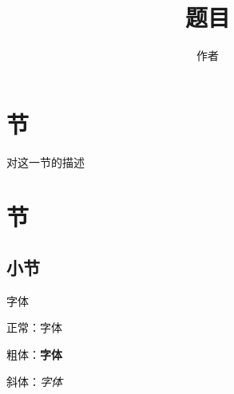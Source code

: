 \documentclass{sty/myarticle}
\title{\heiti 题目}
\author{作者}
\date{}
\begin{document}
\maketitle
\pagestyle{plain}

\section{节}

对这一节的描述

\section{节}

\subsection{小节}
字体

正常：字体

粗体：\textbf{字体}

斜体：\textit{字体}
\end{document}
